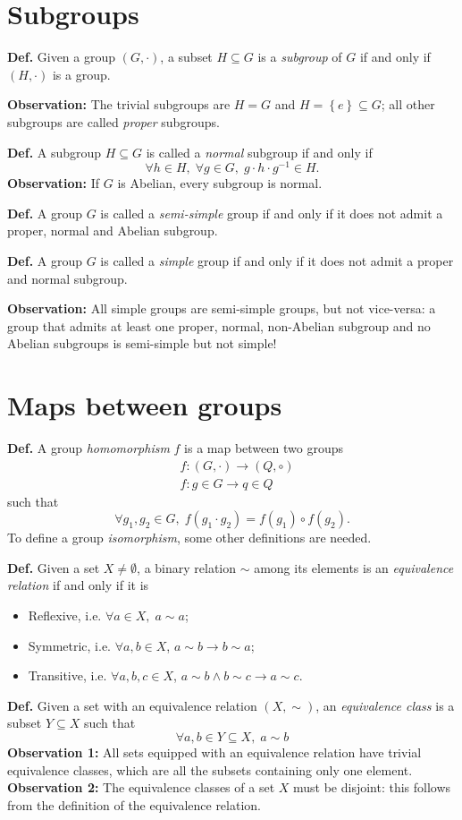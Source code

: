 \section{Subgroups}
\textbf{Def.} Given a group $(G,\cdot)$, a subset $H\subseteq G$ is a
\textit{subgroup} of $G$ if and only if $(H,\cdot)$ is a group.

\textbf{Observation:} The trivial subgroups are $H=G$ and $H=\left\{e\right\}
\subseteq G$; all other subgroups are called \textit{proper} subgroups.

\textbf{Def.} A subgroup $H\subseteq G$ is called a \textit{normal} subgroup if and
only if
    $$\forall h\in H,\;\forall g\in G,\;g\cdot h \cdot g^{-1}\in H.$$
\textbf{Observation:} If $G$ is Abelian, every subgroup is normal.

\textbf{Def.} A group $G$ is called a \textit{semi-simple} group if and only if it
does not admit a proper, normal and Abelian subgroup.

\textbf{Def.} A group $G$ is called a \textit{simple} group if and only if it does
not admit a proper and normal subgroup.

\textbf{Observation:} All simple groups are semi-simple groups, but not vice-versa:
a group that admits at least one proper, normal, non-Abelian subgroup and no Abelian
subgroups is semi-simple but not simple!
\section{Maps between groups}
\textbf{Def.} A group \textit{homomorphism} $f$ is a map between two groups
\begin{align*}
&f:(G,\cdot)\rightarrow(Q,\circ)\\
&f: g\in G \rightarrow q\in Q
\end{align*}
such that
$$\forall g_1,g_2\in G,\;f(g_1\cdot g_2) = f(g_1)\circ f(g_2).$$
To define a group \textit{isomorphism}, some other definitions are needed.

\textbf{Def.} Given a set $X\neq\emptyset$, a binary relation $\sim$ among its
elements is an \textit{equivalence relation} if and only if it is
\begin{itemize}
    \item Reflexive, i.e. $\forall a\in X,\;a\sim a$;
    \item Symmetric, i.e. $\forall a,b\in X$, $a\sim b \rightarrow b\sim a$;
    \item Transitive, i.e. $\forall a,b,c\in X$, $a\sim b \land b\sim c \rightarrow
	a\sim c$.
\end{itemize}
\textbf{Def.} Given a set with an equivalence relation $(X,\sim)$, an \textit{
equivalence class} is a subset $Y\subseteq X$ such that
$$\forall a,b\in Y\subseteq X,\;a\sim b$$
\textbf{Observation 1:} All sets equipped with an equivalence relation have trivial
equivalence classes, which are all the subsets containing only one element.\\
\textbf{Observation 2:} The equivalence classes of a set $X$ must be disjoint: this
follows from the definition of the equivalence relation.

